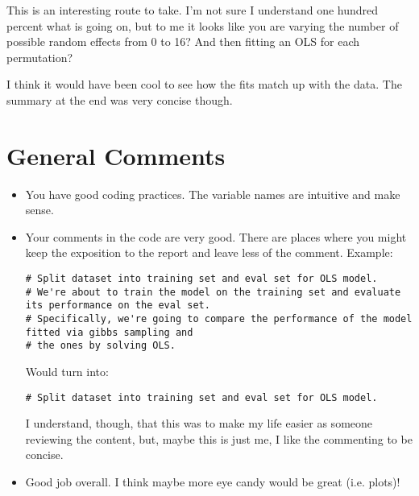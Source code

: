 \documentclass[12pt]{article}
\begin{document}
    This is an interesting route to take. I'm not sure I understand one hundred percent what is going on, but to me it looks like you are varying the number of possible random effects from 0 to 16? And then fitting an OLS for each permutation?

    I think it would have been cool to see how the fits match up with the data. The summary at the end was very concise though.

    \section*{General Comments}

    \begin{itemize}

      \item You have good coding practices. The variable names are intuitive and make sense.

      \item Your comments in the code are very good. There are places where you might keep the exposition to the report and leave less of the comment. Example:
      \begin{lstlisting}
# Split dataset into training set and eval set for OLS model.
# We're about to train the model on the training set and evaluate its performance on the eval set.
# Specifically, we're going to compare the performance of the model fitted via gibbs sampling and 
# the ones by solving OLS. 
      \end{lstlisting}

      \noindent Would turn into:

      \begin{lstlisting}
# Split dataset into training set and eval set for OLS model.
      \end{lstlisting}

      \noindent I understand, though, that this was to make my life easier as someone reviewing the content, but, maybe this is just me, I like the commenting to be concise.

      \item Good job overall. I think maybe more eye candy would be great (i.e. plots)!

    \end{itemize}
\end{document}
